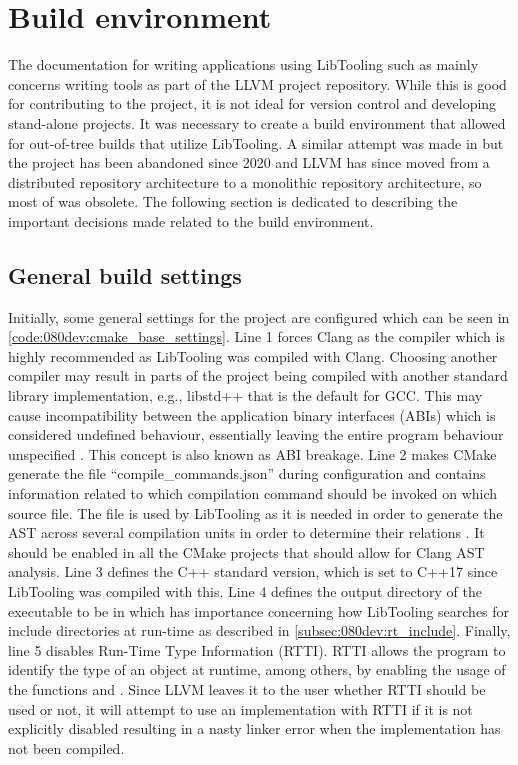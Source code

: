 \section{Build environment}

The documentation for writing applications using LibTooling such as \cite{MatchingClangAST, ClangTransformerTutorial} mainly concerns writing tools as part of the LLVM project repository. While this is good for contributing to the project, it is not ideal for version control and developing stand-alone projects.
It was necessary to create a build environment that allowed for out-of-tree builds that utilize LibTooling. A similar attempt was made in \cite{kasmisClangOutoftreeBuild2023} but the project has been abandoned since 2020 and LLVM has since moved from a distributed repository architecture to a monolithic repository architecture, so most of \cite{kasmisClangOutoftreeBuild2023} was obsolete.
The following section is dedicated to describing the important decisions made related to the build environment.

\subsection{General build settings}

Initially, some general settings for the project are configured which can be seen in \cref{code:080dev:cmake_base_settings}.
Line 1 forces Clang as the compiler which is highly recommended as LibTooling was compiled with Clang. Choosing another compiler may result in parts of the project being compiled with another standard library implementation, e.g., libstd++ that is the default for GCC. This may cause incompatibility between the application binary interfaces (ABIs) which is considered undefined behaviour, essentially leaving the entire program behaviour unspecified \cite{cppreferenceUndefinedBehaviorCppreference}. This concept is also known as ABI breakage.
Line 2 makes CMake generate the file ``compile\_commands.json'' during configuration and contains information related to which compilation command should be invoked on which source file. 
The file is used by LibTooling as it is needed in order to generate the AST across several compilation units in order to determine their relations \cite{JSONCompilationDatabase}. It should be enabled in all the CMake projects that should allow for Clang AST analysis.
Line 3 defines the C++ standard version, which is set to C++17 since LibTooling was compiled with this.
Line 4 defines the output directory of the executable to be in  which has importance concerning how LibTooling searches for include directories at run-time as described in \cref{subsec:080dev:rt_include}.
Finally, line 5 disables Run-Time Type Information (RTTI). RTTI allows the program to identify the type of an object at runtime, among others, by enabling the usage of the functions  and . Since LLVM leaves it to the user whether RTTI should be used or not, it will attempt to use an implementation with RTTI if it is not explicitly disabled resulting in a nasty linker error when the implementation has not been compiled.

